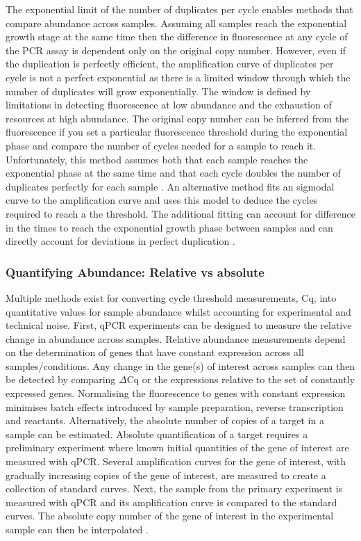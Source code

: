 \documentclass[../main.tex]{subfiles}
\begin{document}
The exponential limit of the number of duplicates per cycle enables methods that compare abundance across samples. 
Assuming all samples reach the exponential growth stage at the same time then the difference in fluorescence at any cycle of the PCR assay is dependent only on the original copy number. 
However, even if the duplication is perfectly efficient, the amplification curve of duplicates per cycle is not a perfect exponential as there is a limited window through which the number of duplicates will grow exponentially.
The window is defined by limitations in detecting fluorescence at low abundance and the exhaustion of resources at high abundance.
The original copy number can be inferred from the fluorescence if you set a particular fluorescence threshold during the exponential phase and compare the number of cycles needed for a sample to reach it.
Unfortunately, this method assumes both that each sample reaches the exponential phase at the same time and that each cycle doubles the number of duplicates perfectly for each sample \parencite{VanGuilder2008}. 
An alternative method fits an sigmodal curve to the amplification curve and uses this model to deduce the cycles required to reach a the threshold.
The additional fitting can account for difference in the times to reach the exponential growth phase between samples and can directly account for deviations in perfect duplication \parencite{Swillens2008}. 

\subsubsection{Quantifying Abundance: Relative vs absolute}

Multiple methods exist for converting cycle threshold measurements, Cq, into quantitative values for sample abundance whilst accounting for experimental and technical noise.
First, qPCR experiments can be designed to measure the relative change in abundance across samples.
Relative abundance measurements depend on the determination of genes that have constant expression across all samples/conditions.
Any change in the gene(s) of interest across samples can then be detected by comparing $\Delta$Cq or the expressions relative to the set of constantly expressed genes.
Normalising the fluorescence to genes with constant expression minimises batch effects introduced by sample preparation, reverse transcription and reactants.
Alternatively, the absolute number of copies of a target in a sample can be estimated.
Absolute quantification of a target requires a preliminary experiment where known initial quantities of the gene of interest are measured with qPCR.
Several amplification curves for the gene of interest, with gradually increasing copies of the gene of interest, are measured to create a collection of standard curves.
Next, the sample from the primary experiment is measured with qPCR and its amplification curve is compared to the standard curves.
The absolute copy number of the gene of interest in the experimental sample can then be interpolated \parencite{Wong2005, VanGuilder2008}.
\end{document}
